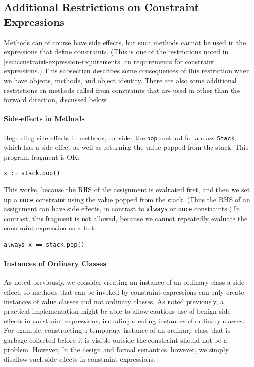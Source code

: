 \subsection{Additional Restrictions on Constraint Expressions}
\label{sec:additional-constraint-restrictions}

Methods can of course have side effects, but such methods cannot be
used in the expressions that define constraints.  (This is one of the
restrictions noted in
\autoref{sec:constraint-expression-requirements} on requirements for
constraint expressions.)  This subsection describes some consequences
of this restriction when we have objects, methods, and object
identity.  There are also some additional restrictions on methods
called from constraints that are used in other than the forward
direction, discussed below.

\paragraph*{Side-effects in Methods}
Regarding side effects in methods, consider the \verb|pop| method for
a class \verb|Stack|, which has a side effect as well as returning the
value popped from the stack.  This program fragment is OK:
\begin{lstlisting}
x := stack.pop()
\end{lstlisting}
This works, because the RHS of the assignment is evaluated first, and
then we set up a \verb|once| constraint using the value popped from
the stack.  (Thus the RHS of an assignment can have side effects, in
contrast to \verb|always| or \verb|once| constraints.) In contrast,
this fragment is not allowed, because we cannot repeatedly evaluate
the constraint expression as a test:
\begin{lstlisting}
always x == stack.pop()
\end{lstlisting}

\paragraph*{Instances of Ordinary Classes}
As noted previously, we consider creating an instance of an ordinary
class a side effect, so methods that can be invoked by constraint
expressions can only create instances of value classes and not
ordinary classes. As noted previously, a practical implementation
might be able to allow cautious use of benign side effects in
constraint expressions, including creating instances of ordinary
classes. For example, constructing a temporary instance of an ordinary
class that is garbage collected before it is visible outside the
constraint should not be a problem. However, In the design and formal
semantics, however, we simply disallow such side effects in constraint
expressions.

